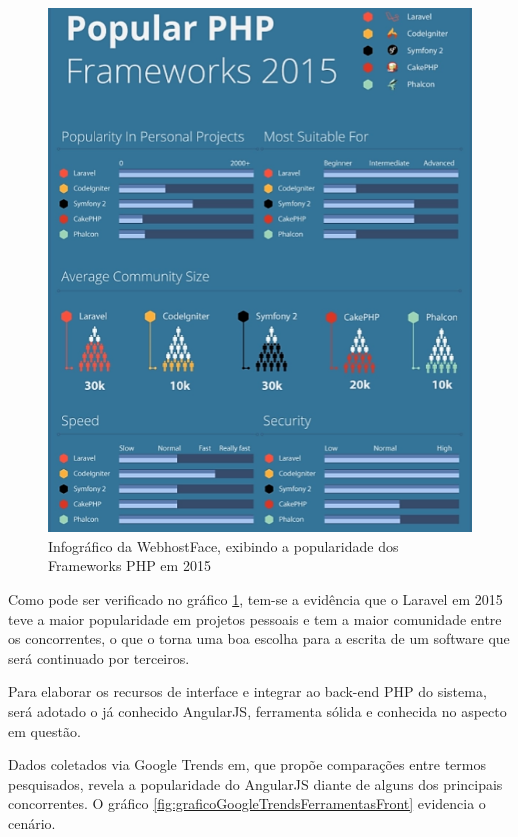 \begin{figure}
	\label{fig:graficoWebhostface}
	\includegraphics[width=1\textwidth]{img/infografico_webhostface}
	\caption{Infográfico da WebhostFace, exibindo a popularidade dos Frameworks PHP em 2015}
\end{figure}


Como pode ser verificado no gráfico \ref{fig:graficoWebhostface}, tem-se a evidência que o Laravel em 2015 teve a maior popularidade em projetos pessoais e tem a maior comunidade entre os concorrentes, o que o torna uma boa escolha para a escrita de um software que será continuado por terceiros.


Para elaborar os recursos de interface e integrar ao back-end PHP do sistema, será adotado o já conhecido AngularJS, ferramenta sólida e conhecida no aspecto em questão. 


Dados coletados via Google Trends em, que propõe comparações entre termos pesquisados, revela a popularidade do AngularJS diante de alguns dos principais concorrentes. O gráfico \ref{fig:graficoGoogleTrendsFerramentasFront} evidencia o cenário.


